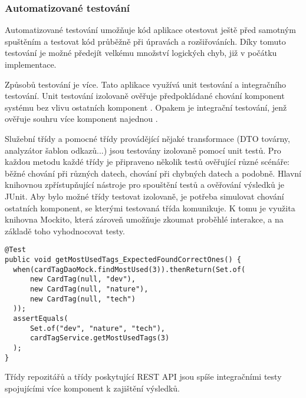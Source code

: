
		\subsubsection{Automatizované testování}

		Automatizované testování umožňuje kód aplikace otestovat ještě před samotným spuštěním a testovat
		kód průběžně při úpravách a rozšiřováních.
		Díky tomuto testování je možné předejít velkému množství logických chyb, již v počátku implementace.

		Způsobů testování je více.
		Tato aplikace využívá unit testování a integračního testování.
		Unit testování izolovaně ověřuje předpokládané chování komponent systému bez vlivu
		ostatních komponent \cite{unit_testing}.
		Opakem je integrační testování, jenž ověřuje souhru více komponent najednou \cite{integration_testing}.

		Služební třídy a pomocné třídy provádějící nějaké transformace (\ac{DTO} továrny, analyzátor šablon odkazů...)
		jsou testovány izolovaně pomocí unit testů.
		Pro každou metodu každé třídy je připraveno několik testů ověřující různé scénáře: běžné chování při různých datech,
		chování při chybných datech a podobně.
		Hlavní knihovnou zpřístupňující nástroje pro spouštění testů a ověřování výsledků je JUnit.
		Aby bylo možné třídy testovat izolovaně, je potřeba simulovat chování ostatních komponent, se kterými testovaná
		třída komunikuje.
		K tomu je využita knihovna Mockito, která zároveň umožňuje zkoumat proběhlé interakce, a na základě toho vyhodnocovat testy.

		\begin{codeblock}
			\begin{verbatim}
@Test
public void getMostUsedTags_ExpectedFoundCorrectOnes() {
  when(cardTagDaoMock.findMostUsed(3)).thenReturn(Set.of(
      new CardTag(null, "dev"),
      new CardTag(null, "nature"),
      new CardTag(null, "tech")
  ));
  assertEquals(
      Set.of("dev", "nature", "tech"),
      cardTagService.getMostUsedTags(3)
  );
}
			\end{verbatim}
		\end{codeblock}

		Třídy repozitářů a třídy poskytující \ac{REST} \ac{API} jsou spíše integračními testy spojujícími více
		komponent k zajištění výsledků.

